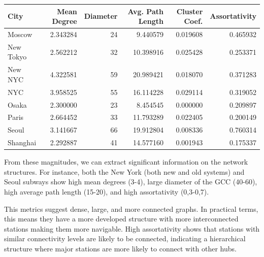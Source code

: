 \begin{table}[h]
\centering
\footnotesize
\begin{tabular}{|l|r|r|r|r|r|}
\hline
\textbf{City} & \textbf{Mean Degree} & \textbf{Diameter} & \textbf{Avg. Path Length} & \textbf{Cluster Coef.} & \textbf{Assortativity} \\ \hline
Moscow        & 2.343284             & 24                & 9.440579                    & 0.019608                        & 0.465932               \\ 
New Tokyo     & 2.562212             & 32                & 10.398916                   & 0.025428                        & 0.253371               \\ 
New NYC       & 4.322581             & 59                & 20.989421                   & 0.018070                        & 0.371283               \\ 
NYC           & 3.958525             & 55                & 16.114228                   & 0.029114                        & 0.319052               \\ 
Osaka         & 2.300000             & 23                & 8.454545                    & 0.000000                        & 0.209897               \\ 
Paris         & 2.664452             & 33                & 11.793289                   & 0.022405                        & 0.200149               \\ 
Seoul         & 3.141667             & 66                & 19.912804                   & 0.008336                        & 0.760314               \\ 
Shanghai      & 2.292887             & 41                & 14.577160                   & 0.001943                        & 0.175337               \\ \hline
\end{tabular}
\end{table}

From these magnitudes, we can extract significant information on the network structures. For instance, both the New York (both new and old systems) and Seoul subways show high mean degrees (3-4), large diameter of the GCC (40-60), high average path length (15-20), and high assortativity (0,3-0,7). 

This metrics suggest dense, large, and more connected graphs. In practical terms, this means they have a more developed structure with more interconnected stations making them more navigable. High assortativity shows that stations with similar connectivity levels are likely to be connected, indicating a hierarchical structure where major stations are more likely to connect with other hubs.

